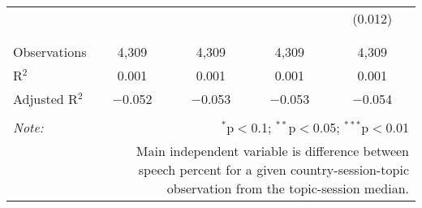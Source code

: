 \begin{table}[!htbp]
\begin{tabular}{@{\extracolsep{5pt}}lcccc}
  &  &  &  & (0.012) \\ 
  & & & & \\ 
\hline \\[-1.8ex] 
Observations & 4,309 & 4,309 & 4,309 & 4,309 \\ 
R$^{2}$ & 0.001 & 0.001 & 0.001 & 0.001 \\ 
Adjusted R$^{2}$ & $-$0.052 & $-$0.053 & $-$0.053 & $-$0.054 \\ 
\hline 
\hline \\[-1.8ex] 
\textit{Note:}  & \multicolumn{4}{r}{$^{*}$p$<$0.1; $^{**}$p$<$0.05; $^{***}$p$<$0.01} \\ 
 & \multicolumn{4}{r}{Main independent variable is difference between speech percent for a given country-session-topic observation from the topic-session median.} \\ 
\end{tabular} 
\end{table} 
